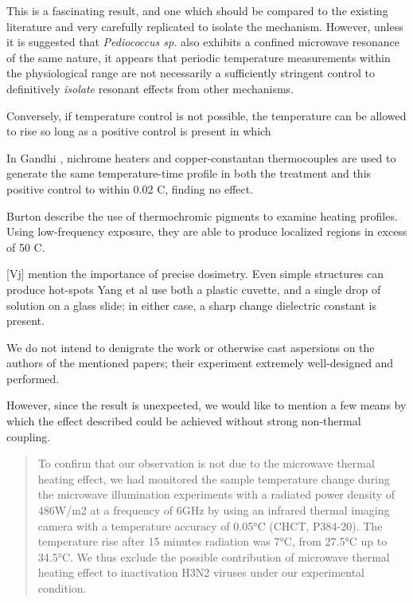 \documentclass[paper.tex]{subfiles}
\begin{document}
\begin{multicols}{1}
This is a fascinating result, and one which should be compared to the existing literature and very carefully replicated to isolate the mechanism. However, unless it is suggested that {\it Pediococcus sp.} also exhibits a confined microwave resonance of the same nature, it appears that periodic temperature measurements within the physiological range are not necessarily a sufficiently stringent control to definitively {\it isolate} resonant effects from other mechanisms.

Conversely, if temperature control is not possible, the temperature can be allowed to rise so long as a positive control is present in which 

In Gandhi \cite{Basic1983}, nichrome heaters and copper-constantan thermocouples are used to generate the same temperature-time profile in both the treatment and this positive control to within 0.02 C, finding no effect. 

Burton\cite{Effects1950} describe the use of thermochromic pigments to examine heating profiles. Using low-frequency exposure, they are able to produce localized regions in excess of 50 C.






[Vj] mention the importance of precise dosimetry. Even simple structures can produce hot-spots 
Yang et al use both a plastic cuvette, and a single drop of solution on a glass slide; in either case, a sharp change dielectric constant is present.


We do not intend to denigrate the work or otherwise cast aspersions on the authors of the mentioned papers; their experiment extremely well-designed and performed. 

However, since the result is unexpected, we would like to mention a few means by which the effect described could be achieved without strong non-thermal coupling.

\begin{quote}
	
	To confirm that our observation is not due to the microwave thermal heating effect, we had monitored the sample temperature change during the microwave illumination experiments with a radiated power density of 486W/m2 at a frequency of 6GHz by using an infrared thermal imaging camera with a temperature accuracy of 0.05°C (CHCT, P384-20). The temperature rise after 15 minutes radiation was 7°C, from 27.5°C up to 34.5°C. We thus exclude the possible contribution of microwave thermal heating effect to inactivation H3N2 viruses under our experimental condition.
	

\end{quote}
\end{multicols}
\end{document}
